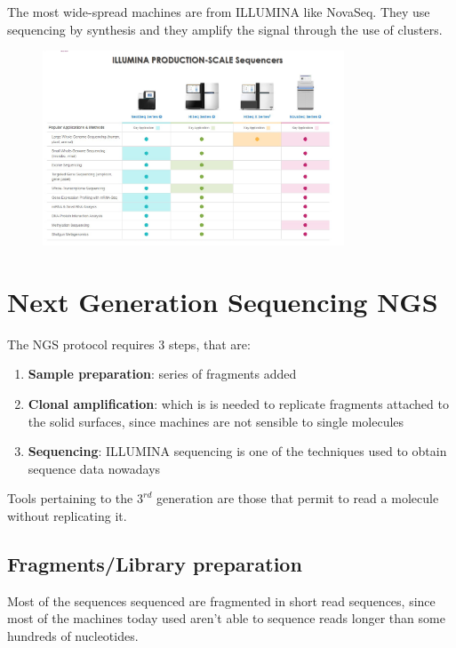 The most wide-spread machines are from ILLUMINA like NovaSeq.
They use sequencing by synthesis and they amplify the signal through the use of clusters.

\begin{figure}[H]
\centering
\includegraphics[width=0.8\textwidth]{sequencingMachinesIllumina}
\caption{}
\label{}
\end{figure}

\section{Next Generation Sequencing NGS}

The NGS protocol requires $3$ steps, that are:

\begin{enumerate}
	\item \textbf{Sample preparation}: series of fragments added
	\item \textbf{Clonal amplification}: which is is needed to replicate fragments attached to the solid surfaces, since machines are not sensible to single molecules
	\item \textbf{Sequencing}: ILLUMINA sequencing is one of the techniques used to obtain sequence data nowadays
\end{enumerate}

Tools pertaining to the $3^{rd}$ generation are those that permit to read a molecule without replicating it.

\subsection{Fragments/Library preparation}
Most of the sequences sequenced are fragmented in short read sequences, since most of the machines today used aren't able to sequence reads longer than some hundreds of nucleotides.


